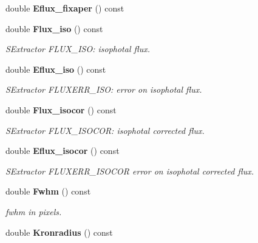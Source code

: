 \begin{CompactItemize}
\item 
{}
double {\bf Eflux\_\-fixaper} () const\label{class_sestar_a20}

\item 
{}
double {\bf Flux\_\-iso} () const\label{class_sestar_a21}

\begin{CompactList}\small\item\em SExtractor FLUX\_\-ISO: isophotal flux.\item\end{CompactList}\item 
{}
double {\bf Eflux\_\-iso} () const\label{class_sestar_a22}

\begin{CompactList}\small\item\em SExtractor FLUXERR\_\-ISO: error on isophotal flux.\item\end{CompactList}\item 
{}
double {\bf Flux\_\-isocor} () const\label{class_sestar_a23}

\begin{CompactList}\small\item\em SExtractor FLUX\_\-ISOCOR: isophotal corrected flux.\item\end{CompactList}\item 
{}
double {\bf Eflux\_\-isocor} () const\label{class_sestar_a24}

\begin{CompactList}\small\item\em SExtractor FLUXERR\_\-ISOCOR error on isophotal corrected flux.\item\end{CompactList}\item 
{}
double {\bf Fwhm} () const\label{class_sestar_a25}

\begin{CompactList}\small\item\em fwhm in pixels.\item\end{CompactList}\item 
{}
double {\bf Kronradius} () const\label{class_sestar_a26}


\end{CompactItemize}
